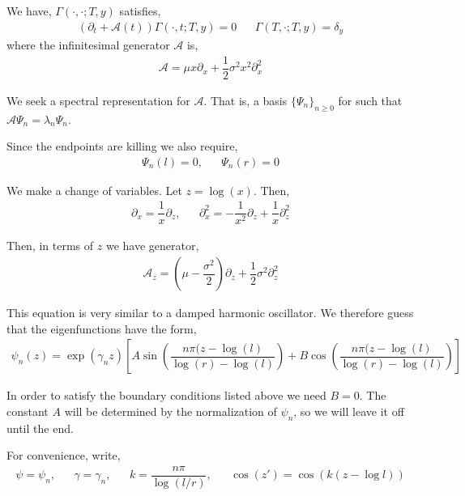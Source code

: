 \begin{solution}[Solution]
We have, \( \Gamma(\cdot, \cdot; T,y) \) satisfies,
\begin{align*}
    (\partial_t + \mathcal{A}(t)) \Gamma(\cdot, t; T,y) = 0 && \Gamma(T, \cdot ;T,y) = \delta_y
\end{align*}
where the infinitesimal generator \( \mathcal{A} \) is,
\begin{align*}
    \mathcal{A}  = \mu x \partial_x + \dfrac{1}{2}\sigma^2 x^2 \partial_x^2
\end{align*}

We seek a spectral representation for \( \mathcal{A} \). That is, a basis \( \{\Psi_n\}_{n\geq 0} \) for such that \( \mathcal{A} \Psi_n  = \lambda_n \Psi_n \).

Since the endpoints are killing we also require,
\begin{align*}
    \Psi_n(l) = 0, && \Psi_n(r) = 0
\end{align*}

We make a change of variables. Let \( z = \log(x) \). Then,
\begin{align*}
    \partial_x = \dfrac{1}{x}\partial_z, && \partial_x^2 = -\dfrac{1}{x^2}\partial_z + \dfrac{1}{x}\partial_z^2 
\end{align*}


Then, in terms of \( z \) we have generator,
\begin{align*}
    \mathcal{A}_z = \left( \mu - \dfrac{\sigma^2}{2} \right) \partial_z + \dfrac{1}{2} \sigma^2 \partial_z^2
\end{align*}


This equation is very similar to a damped harmonic oscillator. We therefore guess that the eigenfunctions have the form,
\begin{align*}
    \psi_n(z) = \exp(\gamma_n z) \left[ A \sin \left( \dfrac{n\pi (z-\log(l)}{\log(r)-\log(l)} \right) + B \cos \left( \dfrac{n\pi (z-\log(l)}{\log(r)-\log(l)} \right) \right]
\end{align*}

In order to satisfy the boundary conditions listed above we need \( B = 0 \). The constant \( A \) will be determined by the normalization of \( \psi_n \), so we will leave it off until the end.

For convenience, write,
\begin{align*}
    \psi = \psi_n, && \gamma = \gamma_n, && k = \dfrac{n\pi}{\log(l/r)}, && \cos(z') = \cos(k(z-\log l))
\end{align*}


\end{solution}
